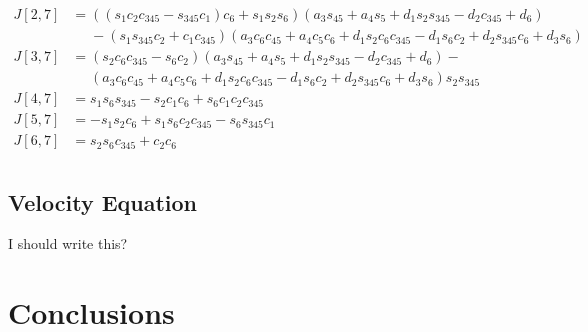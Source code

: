 \documentclass{article}
\begin{document}
\begin{align*}
J[2,7] &= \left(\left(s_{1} c_{2} c_{345} - s_{345} c_{1}\right) c_{6} + s_{1} s_{2} s_{6}\right) \left(a_{3} s_{45} + a_{4} s_{5} + d_{1} s_{2} s_{345} - d_{2} c_{345} + d_{6}\right) \\
       &\phantom{=}- \left(s_{1} s_{345} c_{2} + c_{1} c_{345}\right) \left(a_{3} c_{6} c_{45} + a_{4} c_{5} c_{6} + d_{1} s_{2} c_{6} c_{345} - d_{1} s_{6} c_{2} + d_{2} s_{345} c_{6} + d_{3} s_{6}\right) \\
J[3,7] &= \left(s_{2} c_{6} c_{345} - s_{6} c_{2}\right) \left(a_{3} s_{45} + a_{4} s_{5} + d_{1} s_{2} s_{345} - d_{2} c_{345} + d_{6}\right) - \\
       &\phantom{=}\left(a_{3} c_{6} c_{45} + a_{4} c_{5} c_{6} + d_{1} s_{2} c_{6} c_{345} - d_{1} s_{6} c_{2} + d_{2} s_{345} c_{6} + d_{3} s_{6}\right) s_{2} s_{345} \\
J[4,7] &= s_{1} s_{6} s_{345} - s_{2} c_{1} c_{6} + s_{6} c_{1} c_{2} c_{345} \\
J[5,7] &= - s_{1} s_{2} c_{6} + s_{1} s_{6} c_{2} c_{345} - s_{6} s_{345} c_{1} \\
J[6,7] &= s_{2} s_{6} c_{345} + c_{2} c_{6} \\
\end{align*}

\subsection{Velocity Equation}
I should write this?

\section{Conclusions}

\nocite{*}


\end{document}
